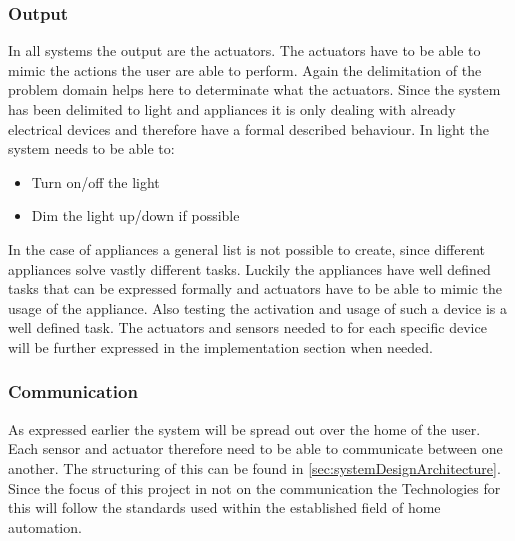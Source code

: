 \subsubsection{Output}
In all systems the output are the actuators. The actuators have to be able to mimic the actions the user are able to perform. Again the delimitation of the problem domain helps here to determinate what the actuators. Since the system has been delimited to light and appliances it is only dealing with already electrical devices and therefore have a formal described behaviour. In light the system needs to be able to:
\begin{itemize}
	\item Turn on/off the light
	\item Dim the light up/down if possible
\end{itemize}
In the case of appliances a general list is not possible to create, since different appliances solve vastly different tasks. Luckily the appliances have well defined tasks that can be expressed formally and actuators have to be able to mimic the usage of the appliance. Also testing the activation and usage of such a device is a well defined task. The actuators and sensors needed to for each specific device will be further expressed in the implementation section when needed.

\subsubsection{Communication}
As expressed earlier the system will be spread out over the home of the user. Each sensor and actuator therefore need to be able to communicate between one another. The structuring of this can be found in \cref{sec:systemDesignArchitecture}. Since the focus of this project in not on the communication the Technologies for this will follow the standards used within the established field of home automation.
